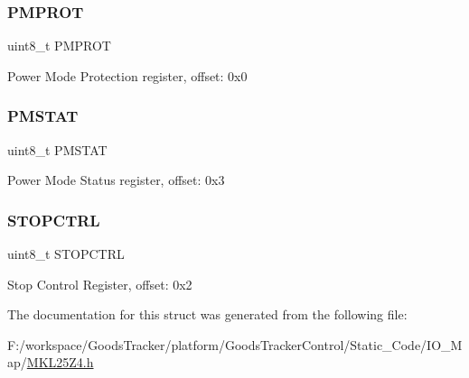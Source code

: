 \subsubsection{\texorpdfstring{P\+M\+P\+R\+OT}{PMPROT}}
{\footnotesize\ttfamily uint8\+\_\+t P\+M\+P\+R\+OT}

Power Mode Protection register, offset\+: 0x0 \mbox{\label{struct_s_m_c___mem_map_adacbe2d7cc2808682b7b83e091b850a8}} 
\subsubsection{\texorpdfstring{P\+M\+S\+T\+AT}{PMSTAT}}
{\footnotesize\ttfamily uint8\+\_\+t P\+M\+S\+T\+AT}

Power Mode Status register, offset\+: 0x3 \mbox{\label{struct_s_m_c___mem_map_a2873244428756490bbc28c84e2161d73}} 
\subsubsection{\texorpdfstring{S\+T\+O\+P\+C\+T\+RL}{STOPCTRL}}
{\footnotesize\ttfamily uint8\+\_\+t S\+T\+O\+P\+C\+T\+RL}

Stop Control Register, offset\+: 0x2 

The documentation for this struct was generated from the following file\+:\begin{DoxyCompactItemize}
\item 
F\+:/workspace/\+Goods\+Tracker/platform/\+Goods\+Tracker\+Control/\+Static\+\_\+\+Code/\+I\+O\+\_\+\+Map/\hyperlink{_m_k_l25_z4_8h}{M\+K\+L25\+Z4.\+h}\end{DoxyCompactItemize}
